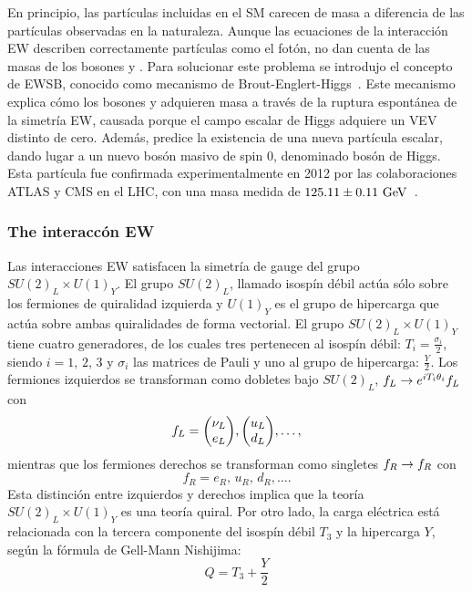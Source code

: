 En principio, las partículas incluidas en el \ac{SM} carecen de masa a diferencia de las partículas observadas en la naturaleza. Aunque las ecuaciones de la interacción \ac{EW} describen correctamente partículas como el fotón, no dan cuenta de las masas de los bosones \Wboson y \Zboson. Para solucionar este problema se introdujo el concepto de \ac{EWSB}, conocido como mecanismo de Brout-Englert-Higgs~\cite{Higgs-1964_1,Higgs-1964_2,Higgs-1966,Englert_Brout-1964}. Este mecanismo explica cómo los bosones \Wboson y \Zboson adquieren masa a través de la ruptura espontánea de la simetría \ac{EW}, causada porque el campo escalar de Higgs adquiere un \ac{VEV} distinto de cero. Además, predice la existencia de una nueva partícula escalar, dando lugar a un nuevo bosón masivo de spin 0, denominado bosón de Higgs. Esta partícula fue confirmada experimentalmente en 2012 por las colaboraciones \ac{ATLAS} y \ac{CMS} en el \ac{LHC}, con una masa medida de \(125.11 \pm 0.11~\text{GeV}\)~\cite{ATLAS-HiggsObservation,CMS-HiggsObservation,ATLAS-Higgs-2024}.








\subsubsection{The interaccón \acl{EW}}

Las interacciones \ac{EW} satisfacen la simetría de gauge del grupo \(SU(2)_L \times U(1)_Y\). El grupo \(SU(2)_L\), llamado isospín débil actúa sólo sobre los fermiones de quiralidad izquierda y \(U(1)_Y\) es el grupo de hipercarga que actúa sobre ambas quiralidades de forma vectorial.
El grupo \(SU(2)_L \times U(1)_Y\) tiene cuatro generadores, de los cuales tres pertenecen al isospín débil: \(T_i = \frac{\sigma_i}{2}\), siendo \(i = 1,\, 2,\, 3\) y \(\sigma_i\) las matrices de Pauli y uno al grupo de hipercarga: \(\frac{Y}{2}\). Los fermiones izquierdos se transforman como dobletes bajo \(SU(2)_L\), \(f_L \rightarrow e^{i T_i \theta_i} f_L\) con
\begin{equation}
    f_L = \mqty( \nu_L\\ e_L ), \mqty( u_L\\ d_L ), \dots,
\end{equation}
mientras que los fermiones derechos se transforman como singletes \(f_R \rightarrow f_R\) con
\begin{equation}
    f_R = e_R, \, u_R,\, d_R, \dots.
\end{equation}
Esta distinción entre izquierdos y derechos implica que la teoría \(SU(2)_L \times U(1)_Y\) es una teoría quiral.
Por otro lado, la carga eléctrica está relacionada con la tercera componente del isospín débil \(T_3\) y la hipercarga \(Y\), según la fórmula de Gell-Mann Nishijima:
\begin{equation}
    Q = T_3 + \frac{Y}{2}
\end{equation}

